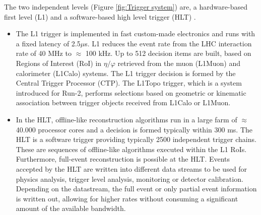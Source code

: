 \documentclass[a4paper, oneside, 11pt, openright]{book}
\begin{document}
					The two independent levels (Figure \ref{fig:Trigger system}) are, a hardware-based first level (L1) and a software-based high level trigger (HLT) \cite{Trigger system}. 
					\begin{itemize}
						\item The L1 trigger is implemented in fast custom-made electronics and runs with a fixed latency of 2.5$\mu$s. L1 reduces the event rate from the LHC interaction rate of 40 MHz to $\approx$ 100 kHz. Up to 512 decision items are built, based on Regions of Interest (RoI) in $\eta/\varphi$ retrieved from the muon (L1Muon) and calorimeter (L1Calo) systems. The L1 trigger decision is formed by the Central Trigger Processor (CTP). The L1Topo trigger, which is a system introduced for Run-2, performs selections based on geometric or kinematic association between trigger objects received from L1Calo or L1Muon. 
						
						\item In the HLT, offline-like reconstruction algorithms run in a large farm of $\approx$ 40.000 processor cores and a decision is formed typically within 300 ms. The HLT is a software trigger providing typically 2500 independent trigger chains. These are sequences of offline-like algorithms executed within the L1 RoIs. Furthermore, full-event reconstruction is possible at the HLT. Events accepted by the HLT are written into different data streams to be used for physics analysis, trigger level analysis, monitoring or detector calibration. Depending on the datastream, the full event or only partial event information is written out, allowing for higher rates without consuming a significant amount of the available bandwidth.
					\end{itemize}
					
\end{document}

